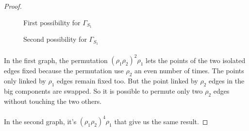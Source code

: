 \begin{proof}
\begin{figure}[H]
\begin{center}
\begin{tikzpicture}[scale=.8]
      \end{tikzpicture}
      \caption{First possibility for $\Gamma_{S_1}$}
    \end{center}
  \end{figure}

  \begin{figure}[H]
    \begin{center}
      \caption{Second possibility for $\Gamma_{S_1}$}
    \end{center}
  \end{figure}

  \paragraph{}
  In the first graph, the permutation $(\rho_1 \rho_2)^2 \rho_1$ lets the points of the two isolated edges fixed because the permutation use $\rho_2$ an even number of times. The points only linked by $\rho_1$ edges remain fixed too. But the point linked by $\rho_2$ edges in the big components are swapped. So it is possible to permute only two $\rho_2$ edges without touching the two others.

  \paragraph{}
  In the second graph, it's $(\rho_1\rho_2)^4 \rho_1$ that give us the same result.


\end{proof}
